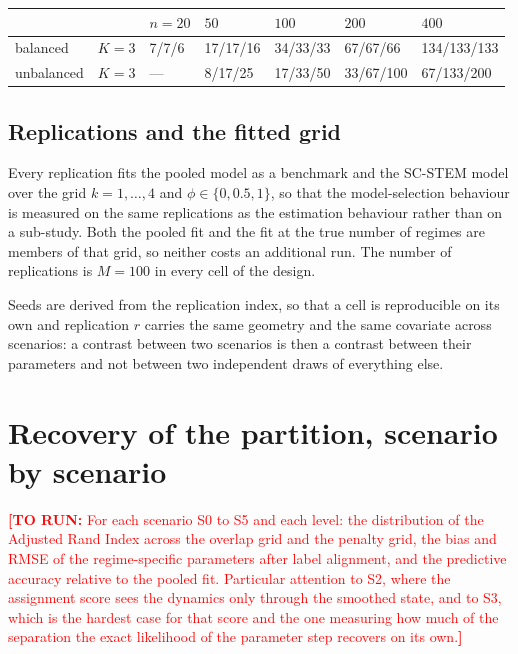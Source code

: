 \documentclass[11pt]{article}
\newcommand{\TODO}[1]{\textcolor{red}{\textbf{[TO RUN:} #1\textbf{]}}}
\begin{document}
\begin{center}
\begin{tabular}{lllllll}
\toprule
& & $n = 20$ & $50$ & $100$ & $200$ & $400$ \\
\midrule
balanced   & $K=3$ & 7/7/6 & 17/17/16 & 34/33/33 & 67/67/66 & 134/133/133 \\
unbalanced & $K=3$ & --- & 8/17/25 & 17/33/50 & 33/67/100 & 67/133/200 \\
\bottomrule
\end{tabular}
\end{center}

\subsection{Replications and the fitted grid}

Every replication fits the pooled model as a benchmark and the SC-STEM model over the grid $k = 1,\dots,4$ and $\phi \in \{0, 0.5, 1\}$, so that the model-selection behaviour is measured on the same replications as the estimation behaviour rather than on a sub-study. Both the pooled fit and the fit at the true number of regimes are members of that grid, so neither costs an additional run. The number of replications is $M = 100$ in every cell of the design.

Seeds are derived from the replication index, so that a cell is reproducible on its own and replication $r$ carries the same geometry and the same covariate across scenarios: a contrast between two scenarios is then a contrast between their parameters and not between two independent draws of everything else.

\section{Recovery of the partition, scenario by scenario}\label{sm:scenarios}
\TODO{For each scenario S0 to S5 and each level: the distribution of the Adjusted Rand Index across the overlap grid and the penalty grid, the bias and RMSE of the regime-specific parameters after label alignment, and the predictive accuracy relative to the pooled fit. Particular attention to S2, where the assignment score sees the dynamics only through the smoothed state, and to S3, which is the hardest case for that score and the one measuring how much of the separation the exact likelihood of the parameter step recovers on its own.}
\end{document}

